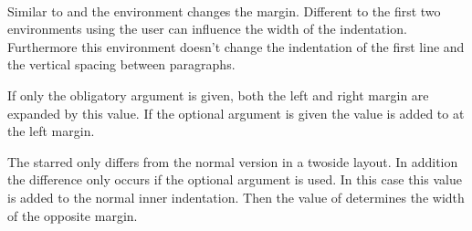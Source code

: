 \begin{Declaration}
  \\
\end{Declaration}
%
Similar to  and  the
 environment changes the margin.
Different to the first two environments using 
the user can influence the width of the indentation. Furthermore this
environment doesn't change the indentation of the first line and the
vertical spacing between paragraphs.

If only the obligatory argument  is given, both the
left and right margin are expanded by this value. If the optional
argument  is given the value  is added to  at the left margin.

The starred  only differs from the normal
version in a twoside layout. In addition the difference only occurs if
the optional argument  is used. In this case
this value is added to the normal inner indentation. Then the value of
 determines the width of the opposite margin.

